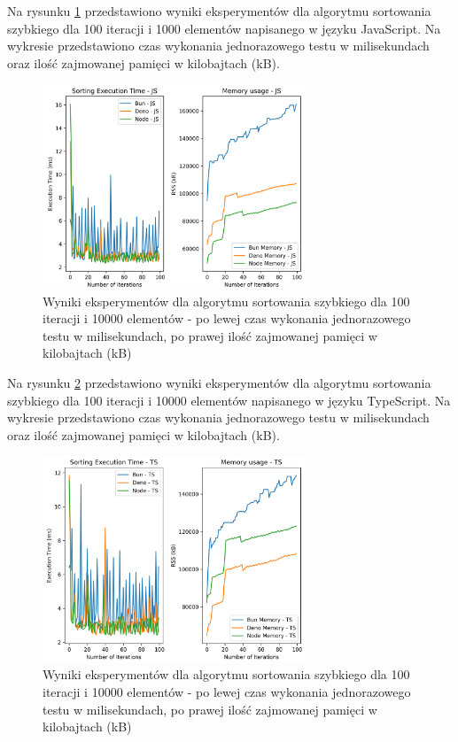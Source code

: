 Na rysunku \ref{fig:quick_sorting_e2} przedstawiono wyniki eksperymentów dla algorytmu sortowania szybkiego dla 100 iteracji i 1000 elementów napisanego w języku JavaScript. Na wykresie przedstawiono czas wykonania jednorazowego testu w milisekundach oraz ilość zajmowanej pamięci w kilobajtach (kB).

\begin{figure}[H]
  \centering
  \includegraphics[width=0.7\textwidth]{Figures/sorting/sorting_quick_100_10000_js.png}
  \caption{Wyniki eksperymentów dla algorytmu sortowania szybkiego dla 100 iteracji i 10000 elementów - po lewej czas wykonania jednorazowego testu w milisekundach, po prawej ilość zajmowanej pamięci w kilobajtach (kB)}
  \label{fig:quick_sorting_e2}
\end{figure}

Na rysunku \ref{fig:quick_sorting_e2_ts} przedstawiono wyniki eksperymentów dla algorytmu sortowania szybkiego dla 100 iteracji i 10000 elementów napisanego w języku TypeScript. Na wykresie przedstawiono czas wykonania jednorazowego testu w milisekundach oraz ilość zajmowanej pamięci w kilobajtach (kB).

\begin{figure}[H]
  \centering
  \includegraphics[width=0.7\textwidth]{Figures/sorting/sorting_quick_100_10000_ts.png}
  \caption{Wyniki eksperymentów dla algorytmu sortowania szybkiego dla 100 iteracji i 10000 elementów - po lewej czas wykonania jednorazowego testu w milisekundach, po prawej ilość zajmowanej pamięci w kilobajtach (kB)}
  \label{fig:quick_sorting_e2_ts}
\end{figure}

